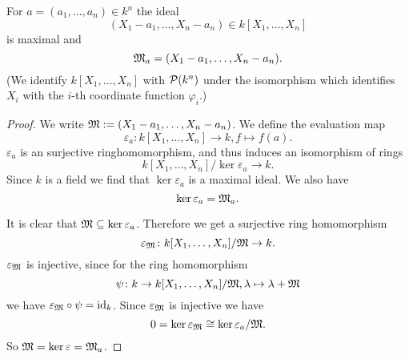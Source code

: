\begin{lem}
 For $a = (a_1, \dotsc, a_n) \in k^n$ the ideal
 \[
  (X_1 - a_1, \dotsc, X_n - a_n) \in k[X_1, \dotsc, X_n]
 \]
 is maximal and
 \[
  \mathfrak{M}_a = (X_1 - a_1, \dotsc, X_n - a_n).
 \]
 (We identify $k[X_1, \dotsc, X_n]$ with $\mathcal{P}(k^n)$ under the isomorphism which identifies $X_i$ with the $i$-th coordinate function $\varphi_i$.)
\end{lem}
\begin{proof}
 We write $\mathfrak{M} := (X_1 - a_1, \dotsc, X_n - a_n)$. We define the evaluation map
 \[
  \varepsilon_a \colon k[X_1, \dotsc, X_n] \to k, f \mapsto f(a).
 \]
 $\varepsilon_a$ is an surjective ringhomomorphism, and thus induces an isomorphism of rings
 \[
  k[X_1, \dotsc, X_n]/\ker \varepsilon_a \to k.
 \]
 Since $k$ is a field we find that $\ker \varepsilon_a$ is a maximal ideal. We also have
 \[
  \ker \varepsilon_a = \mathfrak{M}_a.
 \]
 
 It is clear that $\mathfrak{M} \subseteq \ker \varepsilon_a$. Therefore we get a surjective ring homomorphism
 \[
  \varepsilon_\mathfrak{M} \colon k[X_1, \dotsc, X_n]/\mathfrak{M} \to k.
 \]
 $\varepsilon_\mathfrak{M}$ is injective, since for the ring homomorphism
 \[
  \psi \colon k \to k[X_1, \dotsc, X_n]/\mathfrak{M}, \lambda \mapsto \lambda + \mathfrak{M}
 \]
 we have $\varepsilon_\mathfrak{M} \circ \psi = \operatorname{id}_k$. Since $\varepsilon_\mathfrak{M}$ is injective we have
 \[
  0 = \ker \varepsilon_\mathfrak{M} \cong \ker \varepsilon_a / \mathfrak{M}.
 \]
 So $\mathfrak{M} = \ker \varepsilon = \mathfrak{M}_a$.
\end{proof}

































